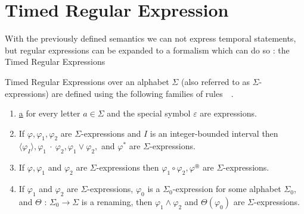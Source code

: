 			

		
	\section{Timed Regular Expression}
	
		With the previously defined semantics we can not express temporal statements,
		but regular expressions can be expanded to a formalism which can do so : 
		the Timed Regular Expressions
		

		\begin{dfn}
			\label{dfn:cep:tre}
			Timed Regular Expressions over an alphabet $\Sigma$ (also referred to as $\Sigma$-expressions)
			are defined using the following families of rules~\citep{tre}~.
			\begin{enumerate}
				\item \underline{a} for every letter $a \in \Sigma$ and the special symbol $\varepsilon$ are expressions.
				\item If $\varphi, \varphi_1, \varphi_2$ are $\Sigma$-expressions and $I$ is an integer-bounded interval then
					$\langle\varphi_I\rangle, \varphi_1~\cdot~\varphi_2, \varphi_1 \vee \varphi_2,$ and $\varphi^\ast$ are $\Sigma$-expressions.
				\item If $\varphi, \varphi_1$ and $\varphi_2$ are $\Sigma$-expressions then $\varphi_1 \circ \varphi_2, \varphi^\circledast$ are
					$\Sigma$-expressions.
				\item If $\varphi_1$ and $\varphi_2$ are $\Sigma$-expressions, $\varphi_0$ is a $\Sigma_0$-expression
					for some alphabet $\Sigma_0$, and $\Theta$ : $\Sigma_0 \rightarrow \Sigma$ is
					a renaming, then $\varphi_1 \wedge \varphi_2$ and $\Theta(\varphi_0)$ are $\Sigma$-expressions.
			\end{enumerate}
		\end{dfn}
		
